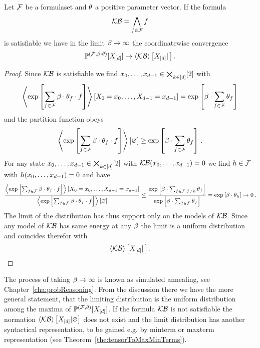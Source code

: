 \begin{theorem}
	Let $\mathcal{F}$ be a formulaset and $\theta$ a positive parameter vector.
	If the formula
		\[ \mathcal{KB} = \bigwedge_{f\in\mathcal{F}} f \]
	is satisfiable we have in the limit $\beta\rightarrow\infty$ the coordinatewise convergence
		\[ \mathbb{P}^{(\mathcal{F},\beta\cdot\theta)}[X_{[d]}] \rightarrow \left\langle \mathcal{KB}\right\rangle \left[ X_{[d]} | \, \right] . \]
\end{theorem}
\begin{proof}
	Since $\mathcal{KB}$ is satisfiable we find $x_{0},\ldots,x_{d-1}\in\bigtimes_{k\in[d]}[2]$ with
		\[  \left\langle \mathrm{exp}\left[\sum_{f\in\mathcal{F}}\beta\cdot \theta_{f} \cdot f\right]\right\rangle \left[ X_{0}=x_{0},\ldots,X_{d-1}=x_{d-1} \right] = \mathrm{exp}\left[\beta \cdot \sum_{f\in\mathcal{F}}\theta_{f}\right]  \]
	and the partition function obeys
		\[ \left\langle \mathrm{exp}\left[\sum_{f\in\mathcal{F}}\beta\cdot \theta_{f} \cdot f\right]\right\rangle \left[ \varnothing \right] \geq  \mathrm{exp}\left[\beta \cdot \sum_{f\in\mathcal{F}}\theta_{f}\right]  \, . \]
	For any state $x_{0},\ldots,x_{d-1}\in\bigtimes_{k\in[d]}[2]$ with $\mathcal{KB}(x_{0},\ldots,x_{d-1})=0$ we find $h\in\mathcal{F}$ with $h(x_{0},\ldots,x_{d-1})=0$ and have
	\begin{align*}
	 	\frac{
		\left\langle \mathrm{exp}\left[\sum_{f\in\mathcal{F}}\beta\cdot \theta_{f} \cdot f\right]\right\rangle \left[ X_{0}=x_{0},\ldots,X_{d-1}=x_{d-1} \right]
		}{
		\left\langle \mathrm{exp}\left[\sum_{f\in\mathcal{F}}\beta\cdot \theta_{f} \cdot f\right]\right\rangle \left[ \varnothing \right]
		} 
		\leq  
	 	\frac{
		\mathrm{exp}\left[\beta\cdot \sum_{f\in\mathcal{F} : f\neq h}\theta_{f}\right]
		}{
		\mathrm{exp}\left[\beta\cdot \sum_{f\in\mathcal{F}}\theta_{f}\right]
		} 
		= \mathrm{exp}\left[\beta \cdot \theta_{h}\right] \rightarrow 0 \, . 
	\end{align*}
	The limit of the distribution has thus support only on the models of $\mathcal{KB}$. 
	Since any model of $\mathcal{KB}$ has same energy at any $\beta$ the limit is a uniform distribution and coincides therefor with
		\[ \left\langle \mathcal{KB}\right\rangle \left[ X_{[d]} | \, \right] . \]
\end{proof}


\begin{remark}
	The process of taking $\beta\rightarrow\infty$ is known as simulated annealing, see Chapter~\ref{cha:probReasoning}.
	From the discussion there we have the more general statement, that the limiting distribution is the uniform distribution among the maxima of $\mathbb{P}^{(\mathcal{F},\theta)}[X_{[d]}]$.
	If the formula $\mathcal{KB}$ is not satisfiable the normation $\left\langle \mathcal{KB}\right\rangle \left[ X_{[d]} | \varnothing \right]$ does not exist and the limit distribution has another syntactical representation, to be gained e.g. by minterm or maxterm representation (see Theorem~\ref{the:tensorToMaxMinTerms}).
\end{remark}






